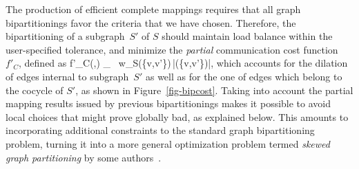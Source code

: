The production of efficient complete mappings requires that all graph
bipartitionings favor the criteria that we have chosen.
Therefore, the bipartitioning of a subgraph~$S'$ of $S$ should maintain
load balance within the user-specified tolerance, and minimize the
\emph{partial\/} communication cost function $f'_C$, defined as
\bn
f'_C(,) \eqdef
\hspace*{-0.45cm}\sum\limits_{\mbox{\scriptsize
             }}\hspace*{-0.45cm}
w_S(\{v,v'\})\,|(\{v,v'\})|\enspace,
\en
which accounts for the dilation of edges internal to subgraph~$S'$ as well as
for the one of edges which belong to the cocycle of $S'$, as shown in
Figure~\ref{fig-bipcost}.
Taking into account the partial mapping results issued by previous
bipartitionings makes it possible to avoid local choices that
might prove globally bad, as explained below.
This amounts to incorporating additional constraints to the standard graph
bipartitioning problem, turning it into a more general optimization problem
termed \emph{skewed graph partitioning\/} by some authors~\cite{heledr97}.

